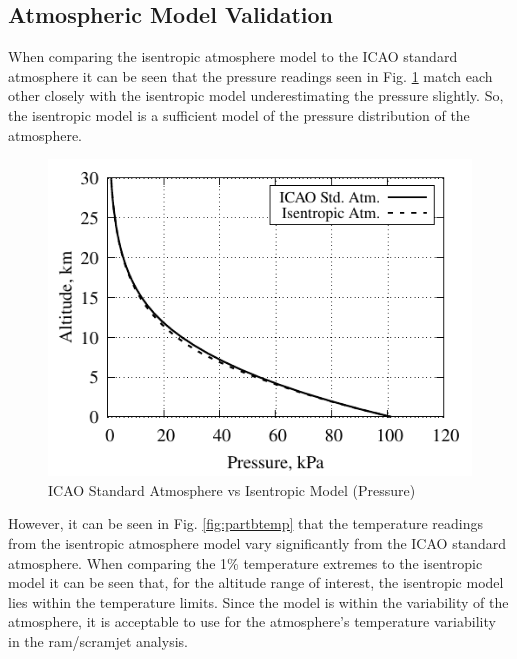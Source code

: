 \documentclass[conf]{new-aiaa} %
\begin{document}
\subsection{Atmospheric Model Validation} %
When comparing the isentropic atmosphere model to the ICAO standard atmosphere it can be seen that the pressure readings seen in Fig. \ref{fig:partbpres} match each other closely with the isentropic model underestimating the pressure slightly. So, the isentropic model is a sufficient model of the pressure distribution of the atmosphere.

\begin{figure}[H] %
    \centering
    \includegraphics[]{media/atmosphere_validation_files/ICAO_vs_ISEN_pressure.pdf}
    \caption{\label{fig:partbpres}ICAO Standard Atmosphere vs Isentropic Model (Pressure)}
\end{figure}

However, it can be seen in Fig. \ref{fig:partbtemp} that the temperature readings from the isentropic atmosphere model vary significantly from the ICAO standard atmosphere. When comparing the 1\% temperature extremes \cite{nasa1976standardatmos} to the isentropic model it can be seen that, for the altitude range of interest, the isentropic model lies within the temperature limits. Since the model is within the variability of the atmosphere, it is acceptable to use for the atmosphere's temperature variability in the ram/scramjet analysis.
\end{document}
